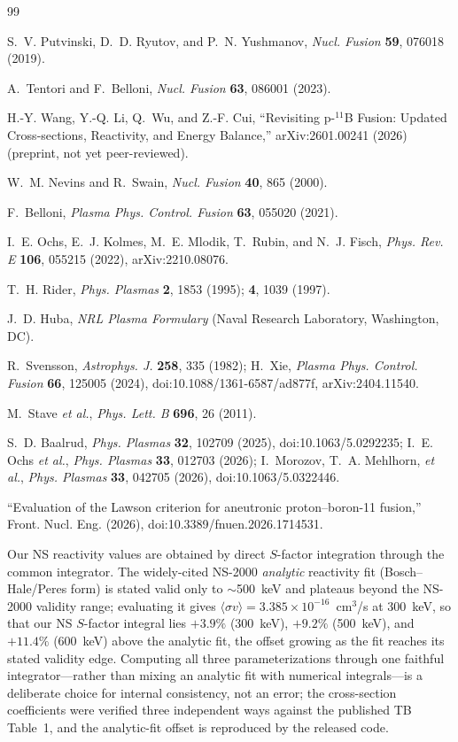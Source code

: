 \documentclass[aip,pop,reprint,amsmath,amssymb,floatfix]{revtex4-2}
\begin{document}
\begin{thebibliography}{99}

 S.~V. Putvinski, D.~D. Ryutov, and P.~N. Yushmanov, \textit{Nucl. Fusion} \textbf{59}, 076018 (2019).

 A.~Tentori and F.~Belloni, \textit{Nucl. Fusion} \textbf{63}, 086001 (2023).

 H.-Y. Wang, Y.-Q. Li, Q.~Wu, and Z.-F. Cui, ``Revisiting p-$^{11}$B Fusion: Updated Cross-sections, Reactivity, and Energy Balance,'' arXiv:2601.00241 (2026) (preprint, not yet peer-reviewed).

 W.~M. Nevins and R.~Swain, \textit{Nucl. Fusion} \textbf{40}, 865 (2000).

 F.~Belloni, \textit{Plasma Phys. Control. Fusion} \textbf{63}, 055020 (2021).

 I.~E. Ochs, E.~J. Kolmes, M.~E. Mlodik, T.~Rubin, and N.~J. Fisch, \textit{Phys. Rev. E} \textbf{106}, 055215 (2022), arXiv:2210.08076.

 T.~H. Rider, \textit{Phys. Plasmas} \textbf{2}, 1853 (1995); \textbf{4}, 1039 (1997).

 J.~D. Huba, \textit{NRL Plasma Formulary} (Naval Research Laboratory, Washington, DC).

 R.~Svensson, \textit{Astrophys. J.} \textbf{258}, 335 (1982); H.~Xie, \textit{Plasma Phys. Control. Fusion} \textbf{66}, 125005 (2024), doi:10.1088/1361-6587/ad877f, arXiv:2404.11540.

 M.~Stave \textit{et al.}, \textit{Phys. Lett. B} \textbf{696}, 26 (2011).

 S.~D. Baalrud, \textit{Phys. Plasmas} \textbf{32}, 102709 (2025), doi:10.1063/5.0292235; I.~E. Ochs \textit{et al.}, \textit{Phys. Plasmas} \textbf{33}, 012703 (2026); I.~Morozov, T.~A. Mehlhorn, \textit{et al.}, \textit{Phys. Plasmas} \textbf{33}, 042705 (2026), doi:10.1063/5.0322446.

 ``Evaluation of the Lawson criterion for aneutronic proton--boron-11 fusion,'' Front. Nucl. Eng. (2026), doi:10.3389/fnuen.2026.1714531.

 Our NS reactivity values are obtained by direct $S$-factor integration through the common integrator. The widely-cited NS-2000 \textit{analytic} reactivity fit (Bosch--Hale/Peres form) is stated valid only to $\sim$500~keV and plateaus beyond the NS-2000 validity range; evaluating it gives $\langle\sigma v\rangle = 3.385\times10^{-16}$~cm$^3$/s at 300~keV, so that our NS $S$-factor integral lies $+3.9\%$ (300~keV), $+9.2\%$ (500~keV), and $+11.4\%$ (600~keV) above the analytic fit, the offset growing as the fit reaches its stated validity edge. Computing all three parameterizations through one faithful integrator---rather than mixing an analytic fit with numerical integrals---is a deliberate choice for internal consistency, not an error; the cross-section coefficients were verified three independent ways against the published TB Table~1, and the analytic-fit offset is reproduced by the released code.


\end{thebibliography}
\end{document}
